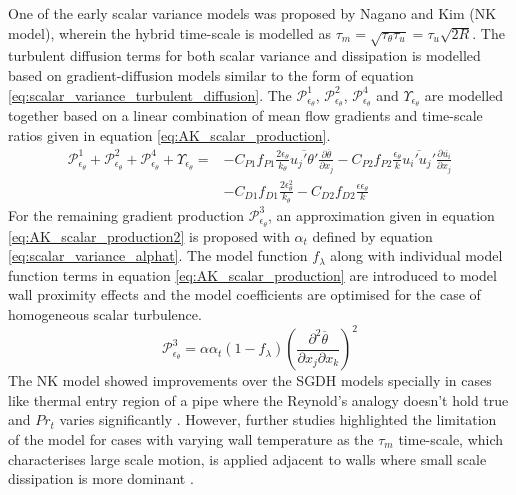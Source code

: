 One of the early scalar variance models was proposed by Nagano and Kim \cite{Nagano1988} (NK model), wherein the hybrid time-scale is modelled as $\tau_{m} = \sqrt{\tau_{\theta}\tau_{u}} = \tau_{u}\sqrt{2R}$. The turbulent diffusion terms for both scalar variance and dissipation is modelled based on gradient-diffusion models similar to the form of equation \ref{eq:scalar_variance_turbulent_diffusion}. The $\mathcal{P}_{\epsilon_{\theta}}^{1}$, $\mathcal{P}_{\epsilon_{\theta}}^{2}$, $\mathcal{P}_{\epsilon_{\theta}}^{4}$ and $\Upsilon_{\epsilon_{\theta}}$ are modelled together based on a linear combination of mean flow gradients and time-scale ratios given in equation \ref{eq:AK_scalar_production}. 
\begin{equation}
\label{eq:AK_scalar_production}
\begin{aligned}
\mathcal{P}_{\epsilon_{\theta}}^{1} + \mathcal{P}_{\epsilon_{\theta}}^{2} + \mathcal{P}_{\epsilon_{\theta}}^{4} + \Upsilon_{\epsilon_{\theta}} = {} & -C_{P1}f_{P1}\frac{2\epsilon_{\theta}}{k_{\theta}}\overline{u_{j}'\theta'}\frac{\partial \overline{\theta}}{\partial x_{j}} - C_{P2}f_{P2}\frac{\epsilon_{\theta}}{k}\overline{u_{i}'u_{j}'}\frac{\partial \overline{u_{i}}}{\partial x_{j}} \\
&- C_{D1}f_{D1}\frac{2\epsilon_{\theta}^{2}}{k_{\theta}} - C_{D2}f_{D2}\frac{\epsilon \epsilon_{\theta}}{k}
\end{aligned}
\end{equation}
For the remaining gradient production $\mathcal{P}_{\epsilon_{\theta}}^{3}$, an approximation given in equation \ref{eq:AK_scalar_production2} is proposed with $\alpha_{t}$ defined by equation \ref{eq:scalar_variance_alphat}. The model function $f_{\lambda}$ along with individual model function terms in equation \ref{eq:AK_scalar_production} are introduced to model wall proximity effects and the model coefficients are optimised for the case of homogeneous scalar turbulence.  
\begin{equation}
\label{eq:AK_scalar_production2}
\mathcal{P}_{\epsilon_{\theta}}^{3} = \alpha\alpha_{t}\left(1-f_{\lambda}\right)\left(\frac{\partial^{2} \overline{\theta}}{\partial x_{j} \partial x_{k}}\right)^{2}
\end{equation}
The NK model showed improvements over the SGDH models specially in cases like thermal entry region of a pipe where the Reynold's analogy doesn't hold true and $Pr_{t}$ varies significantly \cite{Nagano1988}. However, further studies highlighted the limitation of the model for cases with varying wall temperature \cite{Yoder2016} as the $\tau_{m}$ time-scale, which characterises large scale motion, is applied adjacent to walls where small scale dissipation is more dominant \cite{Nagano1996}. 

